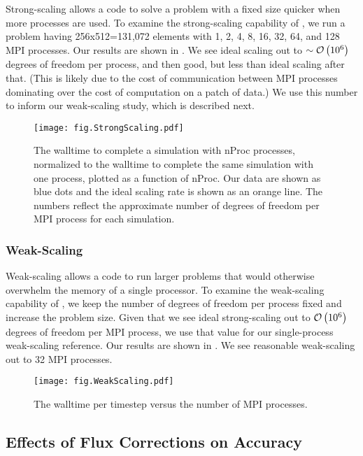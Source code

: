 Strong-scaling allows a code to solve a problem with a fixed size quicker when
more processes are used.
To examine the strong-scaling capability of \thornado, we run
a problem having 256x512=131,072 elements with
1, 2, 4, 8, 16, 32, 64, and 128 MPI processes.
Our results are shown in .
We see ideal scaling out to $\sim\mathcal{O}\left(10^{6}\right)$ degrees of freedom
per process, and then good, but less than ideal scaling after that.
(This is likely due to the cost of communication between MPI processes
dominating over the cost of computation on a patch of data.)
We use this number to inform our weak-scaling study, which is described next.
\begin{figure}[htb!]
  \centering
  \texttt{[image: fig.StrongScaling.pdf]}
  \caption{The walltime to complete a simulation with nProc
processes, normalized to the walltime to complete the same simulation with one
process, plotted as a function of nProc.
Our data are shown as blue dots and the ideal scaling rate is shown as an
orange line.
The numbers reflect the approximate number of degrees of freedom per MPI
process for each simulation.}
  \label{fig.SS}
\end{figure}

\subsubsection{Weak-Scaling}

Weak-scaling allows a code to run larger problems that would otherwise
overwhelm the memory of a single processor.
To examine the weak-scaling capability of \thornado, we keep the number
of degrees of freedom per process fixed and increase the problem
size.
Given that we see ideal strong-scaling out to $\mathcal{O}\left(10^{6}\right)$
degrees of freedom per MPI process, we use that value for our single-process
weak-scaling reference.
Our results are shown in .
We see reasonable weak-scaling out to 32 MPI processes.
\begin{figure}[htb!]
  \centering
  \texttt{[image: fig.WeakScaling.pdf]}
  \caption{The walltime per timestep versus the number of MPI processes.}
  \label{fig.WS}
\end{figure}

\subsection{Effects of Flux Corrections on Accuracy}

